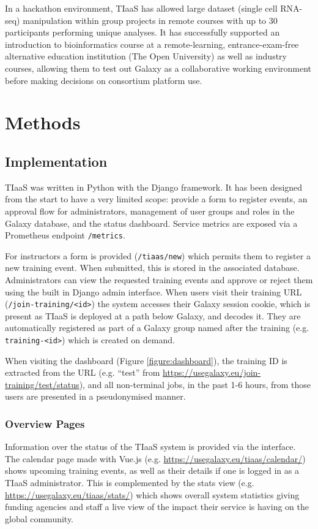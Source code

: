 \documentclass[a4paper,num-refs]{oup-contemporary}
\begin{document}
In a hackathon environment, TIaaS has allowed large dataset (single cell RNA-seq) manipulation within group projects in remote courses with up to 30 participants performing unique analyses\cite{Bacon_2022}. It has successfully supported an introduction to bioinformatics course at a remote-learning, entrance-exam-free alternative education institution (The Open University) as well as industry courses, allowing them to test out Galaxy as a collaborative working environment before making decisions on consortium platform use.

\section{Methods}

\subsection{Implementation}
TIaaS was written in Python with the Django framework. It has been designed from the start to have a very limited scope: provide a form to register events, an approval flow for administrators, management of user groups and roles in the Galaxy database, and the status dashboard. Service metrics are exposed via a Prometheus endpoint \texttt{/metrics}.

For instructors a form is provided (\texttt{/tiaas/new}) which permits them to register a new training event. When submitted, this is stored in the associated database. Administrators can view the requested training events and approve or reject them using the built in Django admin interface. When users visit their  training URL (\texttt{/join-training/<id>}) the system accesses their Galaxy session cookie, which is present as TIaaS is deployed at a path below Galaxy, and decodes it. They are automatically registered as part of a Galaxy group named after the training (e.g. \texttt{training-<id>}) which is created on demand.

When visiting the dashboard (Figure \ref{figure:dashboard}), the training ID is extracted from the URL (e.g. ``test'' from \url{https://usegalaxy.eu/join-training/test/status}), and all non-terminal jobs, in the past 1-6 hours, from those users are presented in a pseudonymised manner.

\subsubsection{Overview Pages}
Information over the status of the TIaaS system is provided via the interface. The calendar page made with Vue.js (e.g. \url{https://usegalaxy.eu/tiaas/calendar/}) shows upcoming training events, as well as their details if one is logged in as a TIaaS administrator. This is complemented by the stats view (e.g. \url{https://usegalaxy.eu/tiaas/stats/}) which shows overall system statistics giving funding agencies and staff a live view of the impact their service is having on the global community.
\end{document}
